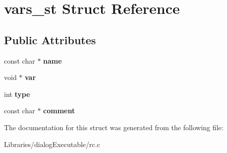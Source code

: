 \hypertarget{structvars__st}{}\section{vars\+\_\+st Struct Reference}
\label{structvars__st}
\subsection*{Public Attributes}
\begin{DoxyCompactItemize}
\item 
const char $\ast$ {\bfseries name}\hypertarget{structvars__st_a01e8b47a3fdc0cea0b794905b3b42df3}{}\label{structvars__st_a01e8b47a3fdc0cea0b794905b3b42df3}

\item 
void $\ast$ {\bfseries var}\hypertarget{structvars__st_abf445d332b4725894842f9540c39f51a}{}\label{structvars__st_abf445d332b4725894842f9540c39f51a}

\item 
int {\bfseries type}\hypertarget{structvars__st_a20258fa2c432b5b044ac526804bab683}{}\label{structvars__st_a20258fa2c432b5b044ac526804bab683}

\item 
const char $\ast$ {\bfseries comment}\hypertarget{structvars__st_a0ef96be017c91f3188db0ce306b92a6e}{}\label{structvars__st_a0ef96be017c91f3188db0ce306b92a6e}

\end{DoxyCompactItemize}


The documentation for this struct was generated from the following file\+:\begin{DoxyCompactItemize}
\item 
Libraries/dialog\+Executable/rc.\+c\end{DoxyCompactItemize}

